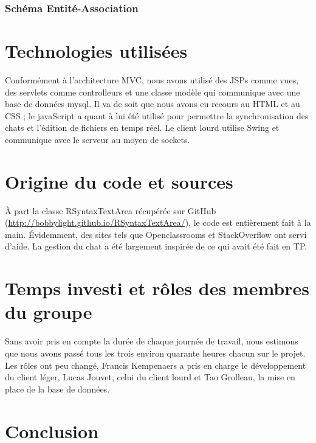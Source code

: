 \documentclass[a4paper, 12pt]{article}
\begin{document}
\subsubsection{Schéma Entité-Association}

\section{Technologies utilisées}

Conformément à l'architecture MVC, nous avons utilisé des JSPs comme vues, des servlets comme controlleurs et une classe modèle qui communique avec une base de données mysql. Il va de soit que nous avons eu recours au HTML et au CSS ; le javaScript a quant à lui été utilisé pour permettre la synchronisation des chats et l'édition de fichiers en temps réel. Le client lourd utilise Swing et communique avec le serveur au moyen de sockets.


\section{Origine du code et sources}

À part la classe RSyntaxTextArea récupérée sur GitHub (\url{http://bobbylight.github.io/RSyntaxTextArea/}), le code est entièrement fait à la main. Évidemment, des sites tels que Openclassrooms et StackOverflow ont servi d'aide. La gestion du chat a été largement inspirée de ce qui avait été fait en TP.

\section{Temps investi et rôles des membres du groupe}

Sans avoir pris en compte la durée de chaque journée de travail, nous estimons que nous avons passé tous les trois environ quarante heures chacun sur le projet.
Les rôles ont peu changé, Francis Kempenaers a pris en charge le développement du client léger, Lucas Jouvet, celui du client lourd et Tao Grolleau, la mise en place de la base de données. 

\section{Conclusion}
\end{document}
